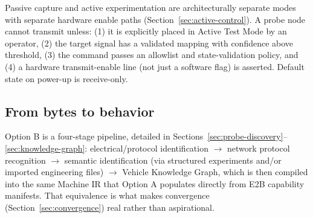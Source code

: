 \begin{decision}[title={Non-negotiable design boundary}]
Passive capture and active experimentation are architecturally separate modes with separate hardware enable paths (Section~\ref{sec:active-control}). A probe node cannot transmit unless: (1) it is explicitly placed in Active Test Mode by an operator, (2) the target signal has a validated mapping with confidence above threshold, (3) the command passes an allowlist and state-validation policy, and (4) a hardware transmit-enable line (not just a software flag) is asserted. Default state on power-up is receive-only.
\end{decision}

\subsection{From bytes to behavior}

Option B is a four-stage pipeline, detailed in Sections~\ref{sec:probe-discovery}--\ref{sec:knowledge-graph}: electrical/protocol identification $\rightarrow$ network protocol recognition $\rightarrow$ semantic identification (via structured experiments and/or imported engineering files) $\rightarrow$ Vehicle Knowledge Graph, which is then compiled into the same Machine IR that Option A populates directly from E2B capability manifests. That equivalence is what makes convergence (Section~\ref{sec:convergence}) real rather than aspirational.
